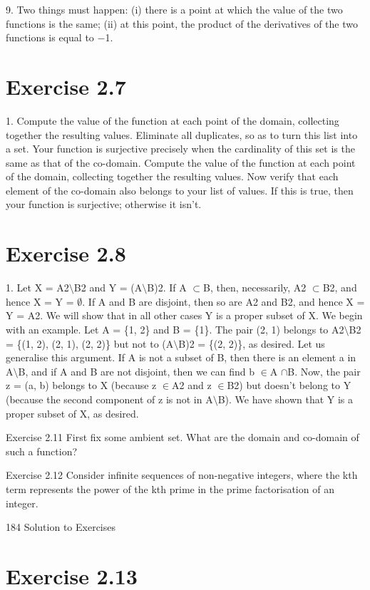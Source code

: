\documentclass[11pt]{article}
\theoremstyle{plain}
\theoremstyle{definition}
\begin{document}
9. Two things must happen: (i) there is a point at which the value of the two functions is the same; (ii) at this point, the product of the derivatives of the two functions is equal to $-$1.

\section{Exercise 2.7}

1. Compute the value of the function at each point of the domain, collecting together the resulting values. Eliminate all duplicates, so as to turn this list into a set. Your function is surjective precisely when the cardinality of this set is the same as that of the co-domain. Compute the value of the function at each point of the domain, collecting together the resulting values. Now verify that each element of the co-domain also belongs to your list of values. If this is true, then your function is surjective; otherwise it isn't.

\section{Exercise 2.8}

1. Let X = A2$\setminus$B2 and Y = (A$\setminus$B)2. If A $\subset$B, then, necessarily, A2 $\subset$B2, and hence X = Y = $\emptyset$. If A and B are disjoint, then so are A2 and B2, and hence X = Y = A2. We will show that in all other cases Y is a proper subset of X. We begin with an example. Let A = \{1, 2\} and B = \{1\}. The pair (2, 1) belongs to A2$\setminus$B2 = \{(1, 2), (2, 1), (2, 2)\} but not to (A$\setminus$B)2 = \{(2, 2)\}, as desired. Let us generalise this argument. If A is not a subset of B, then there is an element a in A$\setminus$B, and if A and B are not disjoint, then we can find b $\in$A $\cap$B. Now, the pair z = (a, b) belongs to X (because z $\in$A2 and z $\in$B2) but doesn't belong to Y (because the second component of z is not in A$\setminus$B). We have shown that Y is a proper subset of X, as desired.

Exercise 2.11 First fix some ambient set. What are the domain and co-domain of such a function?

Exercise 2.12 Consider infinite sequences of non-negative integers, where the kth term represents the power of the kth prime in the prime factorisation of an integer.

184 Solution to Exercises

\section{Exercise 2.13}
\end{document}
